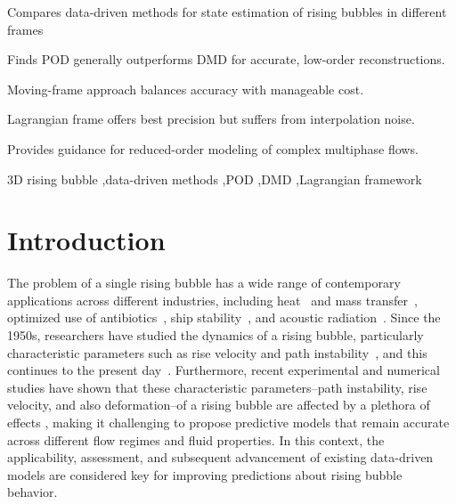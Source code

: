 \documentclass[a4paper,fleqn]{cas-sc}
\begin{document}
	\begin{highlights}
		\item Compares data-driven methods for state estimation of rising bubbles in different frames
		\item Finds POD generally outperforms DMD for accurate, low-order reconstructions.
		\item Moving-frame approach balances accuracy with manageable cost.
		\item Lagrangian frame offers best precision but suffers from interpolation noise.
		\item Provides guidance for reduced-order modeling of complex multiphase flows.
	\end{highlights}
	
	\begin{keywords}
		3D rising bubble \sep data-driven methods \sep POD \sep DMD \sep Lagrangian framework
	\end{keywords}

	\maketitle
	\linenumbers
	

	\section{Introduction}
	\label{Introduction}
	
	The problem of a single rising bubble has a wide range of contemporary applications across different industries, including heat~\cite{Larimi2018} and mass transfer~\cite{Kentheswaran2023}, optimized use of antibiotics~\cite{Hamdollahi2022}, ship stability~\cite{Fang2022}, and acoustic radiation~\cite{Ouyang2021}. Since the 1950s, researchers have studied the dynamics of a rising bubble, particularly characteristic parameters such as rise velocity and path instability~\cite{Saffman1956,TSUGE1977,Duineveld1995}, and this continues to the present day~\cite{Shi2024,Bonnefis2024,Hosen2024}. Furthermore, recent experimental and numerical studies have shown that these characteristic parameters--path instability, rise velocity, and also deformation--of a rising bubble are affected by a plethora of effects \cite{Liu2006,Cano-Lozano2016,Kure2021}, making it challenging to propose predictive models that remain accurate across different flow regimes and fluid properties. In this context, the applicability, assessment, and subsequent advancement of existing data-driven models are considered key for improving predictions about rising bubble behavior.
	
\end{document}
